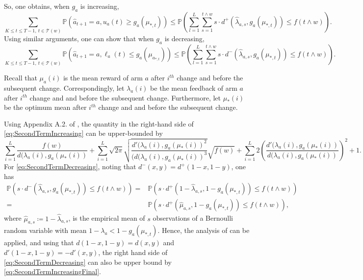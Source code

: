 \documentclass[letterpaper]{article} %
\newcommand{\bP}{\mathds{P}}
\newcommand{\ArmAt}{\hat{a}}
\newcommand{\defined}{\coloneqq}
\newcommand{\IsEqual}{=}
\newcommand{\MeanReAtIChanges}[2]{\mu_#1(#2)}
\newcommand{\optMeanAtIChanges}[1]{\mu_{*}(#1)}
\newcommand{\MeanFeAtIChanges}[2]{\lambda_#1(#2)}
\newcommand{\optArm}[1]{a_{*, #1}}
\newcommand{\optMean}[1]{\mu_{*, #1}}
\newcommand{\noChange}{\mathcal{T}}
\newcommand{\windowsize}{w}
\begin{document}
So, one obtains, when $g_a$ is increasing, 
\begin{equation} 
\sum_{K \leq t \leq T-1, \ t \in \noChange(\windowsize)} \mathds{P}\left(\ArmAt_{t+1} \IsEqual a, u_a(t) \geq g_a(\optMean{t})\right) \leq \bP \left( \sum_{l=1}^{L}  \sum_{s=1}^{t \wedge \windowsize}  s \cdot d^+(\hat{\lambda}_{a,s},g_a(\optMean{t})) \leq f(t \wedge \windowsize ) \right).
\label{eq:SecondTermIncreasing}\end{equation}
Using similar arguments, one can show that when $g_a$ is decreasing,
\begin{equation}
\sum_{K \leq t \leq T-1, \ t \in \noChange(\windowsize)} \mathds{P}\left(\ArmAt_{t+1} \IsEqual a, \ell_a(t) \leq g_a(\mu_{\optArm{t}})\right) \leq \bP \left( \sum_{l=1}^{L}  \sum_{s=1}^{t \wedge \windowsize}  s \cdot d^-(\hat{\lambda}_{a,s},g_a(\optMean{t})) \leq f(t \wedge \windowsize ) \right).
\label{eq:SecondTermDecreasing}\end{equation}

Recall that $\MeanReAtIChanges{a}{i}$ is the mean reward of arm $a$ after $i^{th}$ change and before the subsequent change. Correspondingly, let $\MeanFeAtIChanges{a}{i}$ be the mean feedback of arm $a$ after $i^{th}$ change and and before the subsequent change. Furthermore, let $\optMeanAtIChanges{i}$ be the optimum mean after $i^{th}$ change and and before the subsequent change. 

Using Appendix A.2. of \cite{KLUCBJournal}, the quantity in the right-hand side of \eqref{eq:SecondTermIncreasing} can be upper-bounded by 
\begin{equation}  \sum_{i=1}^{L} \frac{ f(\windowsize)}{d(\MeanFeAtIChanges{a}{i},g_a(\optMeanAtIChanges{i})}
+ \sum_{i=1}^{L} \sqrt{2\pi}\sqrt{\frac{d'(\MeanFeAtIChanges{a}{i},g_a(\optMeanAtIChanges{i})^2}{(d(\MeanFeAtIChanges{a}{i},g_a(\optMeanAtIChanges{i})^3}}\sqrt{f(\windowsize)} + \sum_{i=1}^{L} 2 \left(\frac{d'(\MeanFeAtIChanges{a}{i},g_a(\optMeanAtIChanges{i})}{d(\MeanFeAtIChanges{a}{i},g_a(\optMeanAtIChanges{i})}\right)^{2} +1 . \label{eq:SecondTermIncreasingFinal}\end{equation}
For \eqref{eq:SecondTermDecreasing}, noting that $d^-(x,y) = d^+(1-x,1-y)$, one has 
\begin{align*}
\bP \left(  s \cdot d^-(\hat{\lambda}_{a,s},g_a(\optMean{t})) \leq  f(t \wedge \windowsize )\right) =& \bP\left( s \cdot d^+(1-\hat{\lambda}_{a,s},1-g_a(\optMean{t})) \leq f(t \wedge \windowsize )  \right)\\
%
=& \bP\left( s \cdot d^+(\hat{\mu}_{a,s},1-g_a(\optMean{t})) \leq f(t \wedge \windowsize )  \right),
\end{align*}
%
where $\hat{\mu}_{a,s} \defined 1-\hat{\lambda}_{a,s}$, is the empirical mean of $s$ observations of a Bernoulli random variable with mean $1-\lambda_a < 1 - g_a(\optMean{t})$. Hence, the analysis of \cite{KLUCBJournal} can be applied, and using that $d(1-x,1-y)=d(x,y)$ and $d'(1-x,1-y)=-d'(x,y)$, the right hand side of \eqref{eq:SecondTermDecreasing} can also be upper bound by \eqref{eq:SecondTermIncreasingFinal}.
\end{document}
